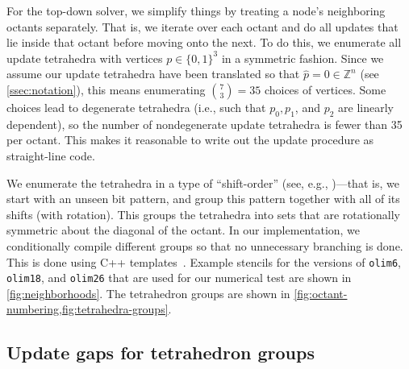 \documentclass{article}
\begin{document}
For the top-down solver, we simplify things by treating a node's
neighboring octants separately. That is, we iterate over each octant
and do all updates that lie inside that octant before moving onto the
next. To do this, we enumerate all update tetrahedra with vertices
$p \in \{0, 1\}^3$ in a symmetric fashion. Since we assume our update
tetrahedra have been translated so that $\hat{p} = 0 \in \mathbb{Z}^n$
(see \cref{ssec:notation}), this means enumerating
${7 \choose 3} = 35$ choices of vertices. Some choices lead to
degenerate tetrahedra (i.e., such that $p_0, p_1$, and $p_2$ are
linearly dependent), so the number of nondegenerate update tetrahedra
is fewer than 35 per octant. This makes it reasonable to write out the
update procedure as straight-line code.

We enumerate the tetrahedra in a type of ``shift-order'' (see, e.g.,
\cite{arndt2010matters})---that is, we start with an unseen bit
pattern, and group this pattern together with all of its shifts (with
rotation). This groups the tetrahedra into sets that are rotationally
symmetric about the diagonal of the octant. In our implementation, we
conditionally compile different groups so that no unnecessary
branching is done. This is done using C++
templates~\cite{stroustrup2013c++}. Example stencils for the versions
of \texttt{olim6}, \texttt{olim18}, and \texttt{olim26} that are used
for our numerical test are shown in \cref{fig:neighborhoods}. The
tetrahedron groups are shown in
\cref{fig:octant-numbering,fig:tetrahedra-groups}.

\subsection{Update gaps for tetrahedron
  groups}\label{ssec:update-gaps}
\end{document}

